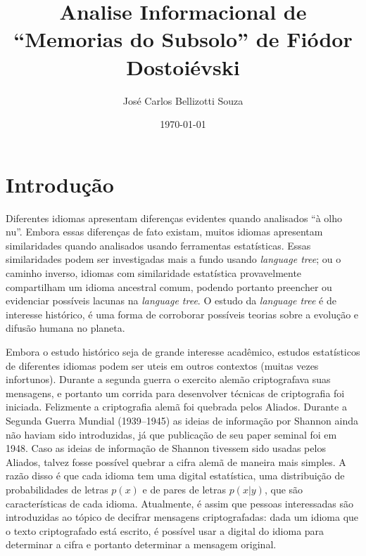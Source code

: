 \documentclass[aps, 10pt, twocolumn, prb, longbibliography, superscriptaddress]{revtex4-2}
\begin{document}
\title{Analise Informacional de ``Memorias do Subsolo'' de Fiódor Dostoiévski}

\author{José Carlos Bellizotti Souza }

\date{\today}

\maketitle

\section{Introdução}

Diferentes idiomas apresentam diferenças evidentes quando
analisados ``à olho nu''. Embora essas diferenças de fato existam,
muitos idiomas apresentam similaridades quando analisados usando
ferramentas estatísticas. Essas similaridades podem ser investigadas
mais a fundo usando \emph{language tree}; ou o caminho inverso,
idiomas com similaridade estatística provavelmente compartilham
um idioma ancestral comum, podendo portanto preencher
ou evidenciar possíveis lacunas na \emph{language tree}.
O estudo da \emph{language tree} é de interesse histórico,
é uma forma de corroborar possíveis teorias sobre a evolução
e difusão humana no planeta.

Embora o estudo histórico seja de grande interesse acadêmico,
estudos estatísticos de diferentes idiomas podem ser uteis
em outros contextos (muitas vezes infortunos). Durante a segunda guerra
o exercito alemão criptografava suas mensagens, e portanto
um corrida para desenvolver técnicas de criptografia foi iniciada.
Felizmente a criptografia alemã foi quebrada pelos Aliados.
Durante a Segunda Guerra Mundial (1939--1945) as ideias de
informação por Shannon ainda não haviam sido introduzidas,
já que publicação de seu paper seminal foi em 1948.
Caso as ideias de informação de Shannon tivessem sido usadas pelos
Aliados, talvez fosse possível quebrar a cifra alemã de maneira
mais simples. A razão disso é que cada idioma tem uma digital estatística,
uma distribuição de probabilidades de letras $p(x)$ e de pares de letras
$p(x|y)$, que são características de cada idioma. Atualmente, é
assim que pessoas interessadas são introduzidas ao tópico
de decifrar mensagens criptografadas: dada um idioma que o texto
criptografado está escrito, é possível usar a digital do idioma
para determinar a cifra e portanto determinar a mensagem original.
\end{document}
